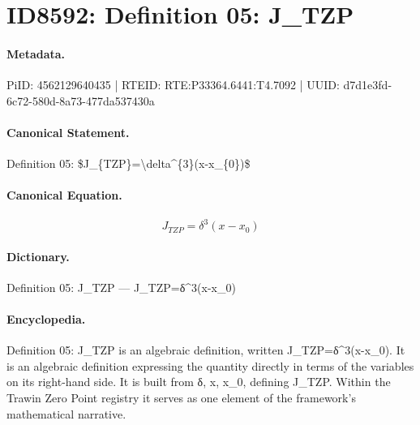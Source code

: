 \section*{ID8592: Definition 05: J\_TZP}
\paragraph{Metadata.}
PiID: 4562129640435 | RTEID: RTE:P33364.6441:T4.7092 | UUID: d7d1e3fd-6c72-580d-8a73-477da537430a

\paragraph{Canonical Statement.}
Definition 05: \$J\_\{TZP\}=\textbackslash{}delta\textasciicircum{}\{3\}(x-x\_\{0\})\$

\paragraph{Canonical Equation.}
\[
J_{TZP}=\delta^{3}(x-x_{0})
\]

\paragraph{Dictionary.}
Definition 05: J\_TZP — J\_TZP=δ\textasciicircum{}3(x-x\_0)

\paragraph{Encyclopedia.}
Definition 05: J\_TZP is an algebraic definition, written J\_TZP=δ\textasciicircum{}3(x-x\_0). It is an algebraic definition expressing the quantity directly in terms of the variables on its right-hand side. It is built from δ, x, x\_0, defining J\_TZP. Within the Trawin Zero Point registry it serves as one element of the framework's mathematical narrative.
